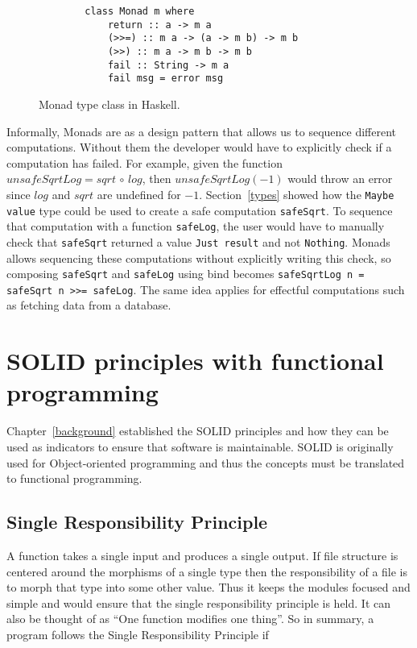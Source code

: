 \begin{figure}[H]
    \begin{lstlisting}
        class Monad m where  
            return :: a -> m a  
            (>>=) :: m a -> (a -> m b) -> m b  
            (>>) :: m a -> m b -> m b  
            fail :: String -> m a  
            fail msg = error msg 
    \end{lstlisting}
    \caption{Monad type class in Haskell.}
    \label{monadclass}
\end{figure}

Informally, Monads are as a design pattern that allows us to sequence different
computations. Without them the developer would have to explicitly check if a
computation has failed. For example, given the function $unsafeSqrtLog =
sqrt\,\circ\,log$, then $unsafeSqrtLog(-1)$ would throw an error since $log$ and
$sqrt$ are undefined for $-1$.  Section~\ref{types} showed how the \texttt{Maybe
value} type could be used to create a safe computation \texttt{safeSqrt}.  To
sequence that computation with a function \texttt{safeLog}, the user would have
to manually check that \texttt{safeSqrt} returned a value \texttt{Just result}
and not \texttt{Nothing}. Monads allows sequencing these computations without
explicitly writing this check, so composing \texttt{safeSqrt} and
\texttt{safeLog} using bind becomes \texttt{safeSqrtLog n = safeSqrt n >>=
safeLog}. The same idea applies for effectful computations such as fetching data
from a database.

\section{SOLID principles with functional programming}\label{dependencyinjection}

Chapter~\ref{background} established the SOLID principles and how they can be
used as indicators to ensure that software is maintainable. SOLID is originally
used for Object-oriented programming and thus the concepts must be translated to
functional programming.

\subsection{Single Responsibility Principle}

A function takes a single input and produces a single output. If file structure
is centered around the morphisms of a single type then the responsibility of a
file is to morph that type into some other value. Thus it keeps the modules
focused and simple and would ensure that the single responsibility principle is
held. It can also be thought of as ``One function modifies one thing''. So in
summary, a program follows the Single Responsibility Principle if 

